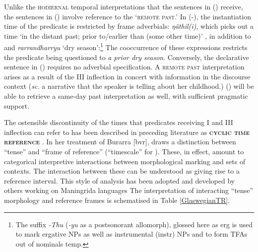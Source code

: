 Unlike the \textsc{hodiernal} temporal interpretations that the sentences in (\blastx) receive, the sentences in (\lastx) involve reference to the `\textsc{remote past}.' In (-),%
 the instantiation time of the predicate is restricted by frame adverbials: \textit{ŋäthil(i)}, which picks out a time `in the distant past; prior to/earlier than (some other time)' \citep[158]{Wilkinson1991}, in addition to and \textit{rarrandharryu} `dry season':\footnote{The suffix \textit{-Thu} (\textit{-yu} as a postsonorant allomorph), glossed here as \gls{erg} is used to mark ergative NPs as well as instrumental (\gls{instr}) NPs and to form TFAs out of nominals \gls{temp}.} The cooccurrence of these expressions restricts the predicate being questioned to \textit{a prior dry season}. Conversely, the declarative sentence in () requires no adverbial specification. A \textsc{remote past} interpretation arises as a result of the \gls{III} inflection in concert with information in the discourse context (\textit{sc.} a narrative that the speaker is telling about her childhood.) () will be able to retrieve a same-day past interpretation as well, with sufficient pragmatic support.

The ostensible discontinuity of the times that predicates receiving \gls{I} and \gls{III} inflection can refer to has been described in preceding literature as \textbf{\textsc{cyclic time reference}} \citep[88]{Comrie1985}. In her treatment of Burarra [\gls{bvr}], \citet{Glasgow1964} draws a distinction between ``tense'' and ``frame of reference'' (``timescale'' for \citealt[48]{Green1987}). These, in effect, amount to categorical interpretive interactions between morphological marking and sets of contexts. The interaction between these can be understood as giving rise to a reference interval. This style of analysis has been adopted and developed by others working on Maningrida languages \citetext{\citealt[165]{Eather2011} for Nakkara [\gls{nck}], \citet{Green1995} for Gurr-goni [\gls{gge}] and \citet{McKay2000} for Ndjébanna [\gls{djj}].} The interpretation of interacting ``tense'' morphology and reference frames is schematised in Table \ref{GlaswegianTR}. 



